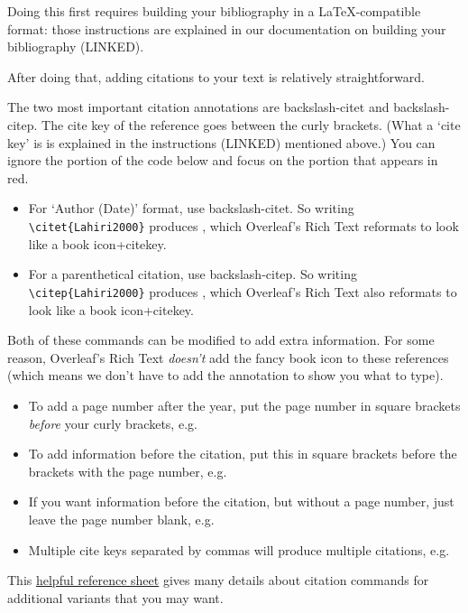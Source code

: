 \documentclass[output=paper,colorlinks,citecolor=brown,
]{langscibook}
\begin{document}
Doing this first requires building your bibliography in a LaTeX-compatible format: those instructions are explained in our documentation on building your bibliography (LINKED). 

After doing that, adding citations to your text is relatively straightforward.

The two most important citation annotations are backslash-citet{} and backslash-citep{}.  The cite key of the reference goes between the curly brackets. (What a `cite key' is is explained in the instructions (LINKED) mentioned above.) You can ignore the \verb|| portion of the code below and focus on the portion that appears in red.
 
 \begin{itemize}
 \item For `Author (Date)' format, use backslash-citet{}. So writing \verb|\citet{Lahiri2000}| produces \citet{Lahiri2000}, which Overleaf's Rich Text reformats to look like a book icon+citekey. 
 \item For a parenthetical citation, use backslash-citep{}. So writing \verb|\citep{Lahiri2000}| produces \citep{Lahiri2000}, which Overleaf's Rich Text also reformats to look like a book icon+citekey. 
 \end{itemize}

\noindent Both of these commands can be modified to add extra information. For some reason, Overleaf's Rich Text \textit{doesn't} add the fancy book icon to these references (which means we don't have to add the \verb|| annotation to show you what to type).
 
 \begin{itemize}
 \item To add a page number after the year, put the page number in square brackets \textit{before} your curly brackets, e.g. \citep[87]{Doke1923} 
 \item To add information before the citation, put this in square brackets before the brackets with the page number, e.g. \citep[Zulu,][87]{Doke1923} 
  \item If you want information before the citation, but without a page number, just leave the page number blank, e.g. \citep[Zulu,][]{Doke1923}
  \item Multiple cite keys separated by commas will produce multiple citations, e.g. \citep{Doke1923,Lahiri2000}
 \end{itemize}
 
This \href{http://merkel.texture.rocks/Latex/natbib.php}{helpful reference sheet} gives many details about citation commands for additional variants that you may want.
\end{document}
